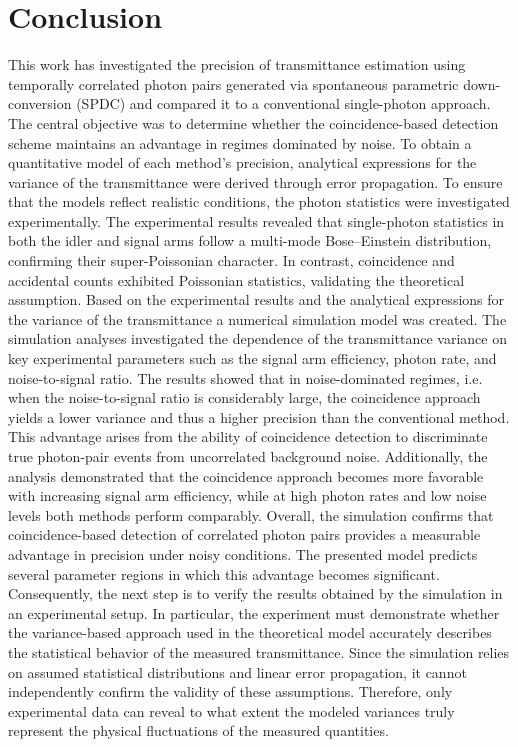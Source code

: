 \section{Conclusion}
This work has investigated the precision of transmittance estimation using temporally correlated photon pairs generated via spontaneous parametric down-conversion (SPDC) and compared it to a conventional single-photon approach. The central objective was to determine whether the coincidence-based detection scheme maintains an advantage in regimes dominated by noise. \newline
To obtain a quantitative model of each method’s precision, analytical expressions for the variance of the transmittance were derived through error propagation. To ensure that the models reflect realistic conditions, the photon statistics were investigated experimentally. \newline
The experimental results revealed that single-photon statistics in both the idler and signal arms follow a multi-mode Bose–Einstein distribution, confirming their super-Poissonian character. In contrast, coincidence and accidental counts exhibited Poissonian statistics, validating the theoretical assumption. Based on the experimental results and the analytical expressions for the variance of the transmittance a numerical simulation model was created. \newline
The simulation analyses investigated the dependence of the transmittance variance on key experimental parameters such as the signal arm efficiency, photon rate, and noise-to-signal ratio. The results showed that in noise-dominated regimes, i.e. when the noise-to-signal ratio is considerably large, the coincidence approach yields a lower variance and thus a higher precision than the conventional method. This advantage arises from the ability of coincidence detection to discriminate true photon-pair events from uncorrelated background noise. Additionally, the analysis demonstrated that the coincidence approach becomes more favorable with increasing signal arm efficiency, while at high photon rates and low noise levels both methods perform comparably. \newline
Overall, the simulation confirms that coincidence-based detection of correlated photon pairs provides a measurable advantage in precision under noisy conditions. The presented model predicts several parameter regions in which this advantage becomes significant. Consequently, the next step is to verify the results obtained by the simulation in an experimental setup. In particular, the experiment must demonstrate whether the variance-based approach used in the theoretical model accurately describes the statistical behavior of the measured transmittance. Since the simulation relies on assumed statistical distributions and linear error propagation, it cannot independently confirm the validity of these assumptions. Therefore, only experimental data can reveal to what extent the modeled variances truly represent the physical fluctuations of the measured quantities. \newline
